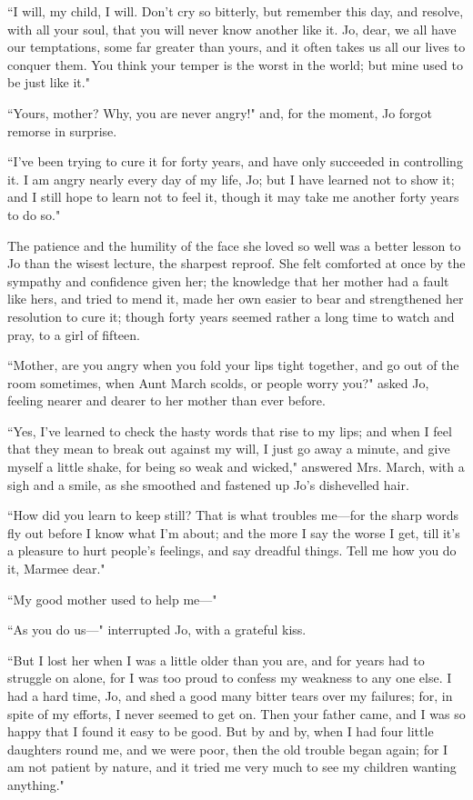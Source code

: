 ``I will, my child, I will. Don't cry so bitterly, but
remember this day, and resolve, with all your soul, that you will never
know another like it. Jo, dear, we all have our temptations, some far
greater than yours, and it often takes us all our lives to conquer them.
You think your temper is the worst in the world; but mine used to be
just like it."

``Yours, mother? Why, you are never angry!" and, for the moment, Jo
forgot remorse in surprise.

``I've been trying to cure it for forty years, and have
only succeeded in controlling it. I am angry nearly every day of my
life, Jo; but I have learned not to show it; and I still hope to learn
not to feel it, though it may take me another forty years to do so."

The patience and the humility of the face she loved so well was a better
lesson to Jo than the wisest lecture, the sharpest reproof. She felt
comforted at once by the sympathy and confidence given her; the
knowledge that her mother had a fault like hers, and tried to mend it,
made her own easier to bear and strengthened her resolution to cure it;
though forty years seemed rather a long time to watch and pray, to a
girl of fifteen.

``Mother, are you angry when you fold your lips tight together, and go
out of the room sometimes, when Aunt March scolds, or people worry you?"
asked Jo, feeling nearer and dearer to her mother than ever before.

``Yes, I've learned to check the hasty words that rise to
my lips; and when I feel that they mean to break out against my will, I
just go away a minute, and give myself a little shake, for being so weak
and wicked," answered Mrs. March, with a sigh and a smile, as she
smoothed and fastened up Jo's dishevelled hair.

``How did you learn to keep still? That is what troubles me---for the
sharp words fly out before I know what I'm about; and
the more I say the worse I get, till it's a pleasure to
hurt people's feelings, and say dreadful things. Tell me
how you do it, Marmee dear."

``My good mother used to help me---"

``As you do us---" interrupted Jo, with a grateful kiss.

``But I lost her when I was a little older than you are, and for years
had to struggle on alone, for I was too proud to confess my weakness to
any one else. I had a hard time, Jo, and shed a good many bitter tears
over my failures; for, in spite of my efforts, I never seemed to get on.
Then your father came, and I was so happy that I found it easy to be
good. But by and by, when I had four little daughters round me, and we
were poor, then the old trouble began again; for I am not patient by
nature, and it tried me very much to see my children wanting anything."

